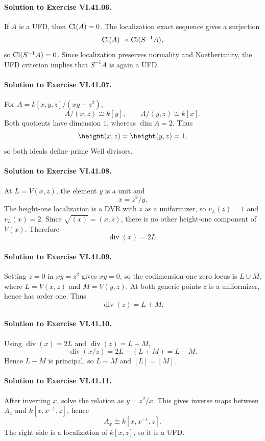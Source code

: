 \paragraph{Solution to Exercise VI.41.06.}
If \(A\) is a UFD, then \(\operatorname{Cl}(A)=0\). The localization exact sequence gives a
surjection
\[
\operatorname{Cl}(A)\twoheadrightarrow\operatorname{Cl}(S^{-1}A),
\]
so \(\operatorname{Cl}(S^{-1}A)=0\). Since localization preserves normality and Noetherianity,
the UFD criterion implies that \(S^{-1}A\) is again a UFD.

\paragraph{Solution to Exercise VI.41.07.}
For \(A=k[x,y,z]/(xy-z^2)\),
\[
A/(x,z)\cong k[y],\qquad A/(y,z)\cong k[x].
\]
Both quotients have dimension \(1\), whereas \(\dim A=2\). Thus
\[
\height(x,z)=\height(y,z)=1,
\]
so both ideals define prime Weil divisors.

\paragraph{Solution to Exercise VI.41.08.}
At \(L=V(x,z)\), the element \(y\) is a unit and
\[
x=z^2/y.
\]
The height-one localization is a DVR with \(z\) as a uniformizer, so
\(v_L(z)=1\) and \(v_L(x)=2\). Since \(\sqrt{(x)}=(x,z)\), there is no other
height-one component of \(V(x)\). Therefore
\[
\operatorname{div}(x)=2L.
\]

\paragraph{Solution to Exercise VI.41.09.}
Setting \(z=0\) in \(xy=z^2\) gives \(xy=0\), so the codimension-one zero locus is
\(L\cup M\), where \(L=V(x,z)\) and \(M=V(y,z)\). At both generic points \(z\) is a
uniformizer, hence has order one. Thus
\[
\operatorname{div}(z)=L+M.
\]

\paragraph{Solution to Exercise VI.41.10.}
Using \(\operatorname{div}(x)=2L\) and \(\operatorname{div}(z)=L+M\),
\[
\operatorname{div}(x/z)=2L-(L+M)=L-M.
\]
Hence \(L-M\) is principal, so \(L\sim M\) and \([L]=[M]\).

\paragraph{Solution to Exercise VI.41.11.}
After inverting \(x\), solve the relation as \(y=z^2/x\). This gives inverse maps
between \(A_x\) and \(k[x,x^{-1},z]\), hence
\[
A_x\cong k[x,x^{-1},z].
\]
The right side is a localization of \(k[x,z]\), so it is a UFD.

